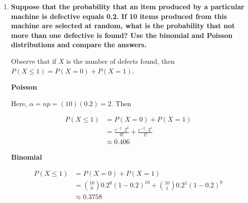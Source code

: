 \documentclass[10pt, oneside]{article}
\begin{document}
\begin{enumerate}[label=8.\arabic*]
\begin{enumerate}
	\item  \begin{tcolorbox}[
	  colback=Cerulean!5!white,
	  colframe=Cerulean!75!black]
	\textbf{What is the expected number of tankers turned away daily?}
	\end{tcolorbox}
	
	Here, the intuition is that the probability of 0 tankers being turned away is equal to the sum of the probabilities that 0, 1, 2, or 3 tankers arrive. Proceeding, the probability of 1 tanker turned away is that of 4 tankers arriving, 2 turned away that of 5 arriving, and so on. Let $X_2$ be the number of tankers turned away. Thus we can express the expectation of the number of turned away tankers as
	
	\[ E[X_2] = \sum^{\infty}_{k = 1} k \cdot \frac{e^{-2} \cdot 2^{k+3}}{(k+3)!} \approx \boxed{0.218} \]
	
	Observe that if $Y$ is the total number of tankers arriving, then it is easy to see that $Y = X_1 + X_2$, and consequently $E[Y] = E[X_1] + E[X_2]$.
	\end{enumerate}

\item  \begin{tcolorbox}[
  colback=Cerulean!5!white,
  colframe=Cerulean!75!black]
\textbf{Suppose that the probability that an item produced by a particular machine is defective equals 0.2. If 10 items produced from this machine are selected at random, what is the probability that not more than one defective is found? Use the binomial and Poisson distributions and compare the answers.}
\end{tcolorbox}

Observe that if $X$ is the number of defects found, then $P(X \leq 1) = P(X = 0) + P(X = 1)$.

\textbf{Poisson}

Here, $\alpha = np = (10)(0.2) = 2$. Then

\begin{align*}
P(X \leq 1) &= P(X = 0) + P(X = 1) \\
&= \frac{e^{-2} \cdot 2^0}{0!} + \frac{e^{-2} \cdot 2^1}{1!} \\
&\approx \boxed{0.406}
\end{align*}

\textbf{Binomial}

\begin{align*}
P(X \leq 1) &= P(X = 0) + P(X = 1) \\
&= \binom{10}{0} 0.2^0 (1-0.2)^{10} + \binom{10}{1} 0.2^1 (1 -0.2)^9 \\
&\approx \boxed{0.3758}
\end{align*}


\end{enumerate}
\end{document}
